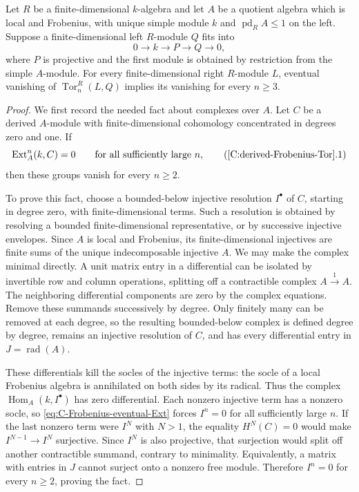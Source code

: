 \begin{lemma}
\label{C:derived-Frobenius-Tor}
Let $R$ be a finite-dimensional $k$-algebra and let $A$ be a
quotient algebra which is local and Frobenius, with unique simple
module $k$ and $\operatorname{pd}_R A\leq1$ on the left.
Suppose a finite-dimensional left $R$-module $Q$ fits into
\[
 0\longrightarrow k\longrightarrow P\longrightarrow Q
 \longrightarrow0,
\]
where $P$ is projective and the first module is obtained by
restriction from the simple $A$-module. For every finite-dimensional
right $R$-module $L$, eventual vanishing of
$\operatorname{Tor}_n^R(L,Q)$ implies its vanishing for every
$n\geq3$.
\end{lemma}
\begin{proof}
We first record the needed fact about complexes over $A$.
Let $C$ be a derived $A$-module with finite-dimensional
cohomology concentrated in degrees zero and one. If
\[
 \operatorname{Ext}_A^n(k,C)=0\qquad\text{for all sufficiently large }n,
                                                               \tag{\ref{C:derived-Frobenius-Tor}.1}\label{eq:C-Frobenius-eventual-Ext}
\]
then these groups vanish for every $n\geq2$.

To prove this fact, choose a bounded-below injective resolution
$I^\bullet$ of $C$, starting in degree zero, with finite-dimensional
terms. Such a resolution is obtained by resolving a bounded
finite-dimensional representative, or by successive injective
envelopes. Since $A$ is local and Frobenius, its finite-dimensional
injectives are finite sums of the unique indecomposable injective
$A$. We may make the complex minimal directly. A unit matrix
entry in a differential can be isolated by invertible row and
column operations, splitting off a contractible complex
$A\xrightarrow{1}A$. The neighboring differential components
are zero by the complex equations. Remove these summands
successively by degree. Only finitely many can be removed at
each degree, so the resulting bounded-below complex is defined
degree by degree, remains an injective resolution of $C$, and
has every differential entry in $J=\operatorname{rad}(A)$.

These differentials kill the socles of the injective terms:
the socle of a local Frobenius algebra is annihilated on both
sides by its radical.
Thus the complex $\operatorname{Hom}_A(k,I^\bullet)$ has zero
differential. Each nonzero injective term has a nonzero socle,
so \eqref{eq:C-Frobenius-eventual-Ext} forces $I^n=0$ for all
sufficiently large $n$.
If the last nonzero term were $I^N$ with $N>1$, the equality
$H^N(C)=0$ would make $I^{N-1}\to I^N$ surjective. Since
$I^N$ is also projective, that surjection would split off
another contractible summand, contrary to minimality.
Equivalently, a matrix with entries in $J$ cannot surject onto
a nonzero free module. Therefore $I^n=0$ for every $n\geq2$,
proving the fact.


\end{proof}
